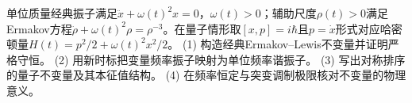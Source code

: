 单位质量经典振子满足\(\ddot x+\omega(t)^2x=0\)，\(\omega(t)>0\)；辅助尺度\(\rho(t)>0\)满足Ermakov方程\(\ddot\rho+\omega(t)^2\rho=\rho^{-3}\)。在量子情形取\([x,p]=i\hbar\)且\(p=\dot x\)形式对应哈密顿量\(H(t)=p^2/2+\omega(t)^2x^2/2\)。
(1) 构造经典Ermakov–Lewis不变量并证明严格守恒。
(2) 用新时标把变量频率振子映射为单位频率谐振子。
(3) 写出对称排序的量子不变量及其本征值结构。
(4) 在频率恒定与突变调制极限核对不变量的物理意义。
